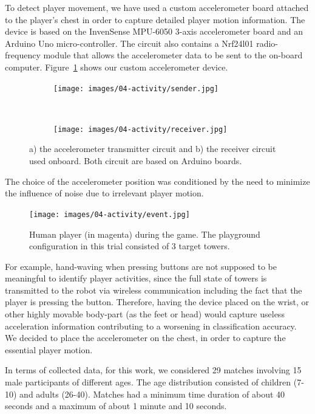 To detect player movement, we have used a custom accelerometer board attached to the player's chest in order to capture detailed player motion information. The device is based on the InvenSense MPU-6050 3-axis accelerometer board and an Arduino Uno micro-controller. The circuit also contains a Nrf24l01 radio-frequency module that allows the accelerometer data to be sent to the on-board computer. Figure~\ref{fig:the_accelerometer} shows our custom accelerometer device.

\begin{figure}[H]
      \centering
      \begin{subfigure}[t]{0.5\textwidth}
      	\centering
	    \texttt{[image: images/04-activity/sender.jpg]}
	    \caption{}
	  \end{subfigure}
	  ~
	  \begin{subfigure}[t]{0.5\textwidth}
      	\centering
	    \texttt{[image: images/04-activity/receiver.jpg]}
	    \caption{}
	  \end{subfigure}
      \caption{a) the accelerometer transmitter circuit and b) the receiver circuit used onboard. Both circuit are based on Arduino boards.}\label{fig:the_accelerometer}
\end{figure}

The choice of the accelerometer position was conditioned by the need to minimize the influence of noise due to irrelevant player motion.

\begin{figure}[thpb]
      \centering
      {\texttt{[image: images/04-activity/event.jpg]}}
      \caption{Human player (in magenta) during the game. The playground configuration in this trial consisted of 3 target towers.}
      \label{game}
\end{figure}

For example, hand-waving when pressing buttons are not supposed to be meaningful to identify player activities, since the full state of towers is transmitted to the robot via wireless communication including the fact that the player is pressing the button. Therefore, having the device placed on the wrist, or other highly movable body-part (as the feet or head) would capture useless acceleration information contributing to a worsening in classification accuracy. We decided to place the accelerometer on the chest, in order to capture the essential player motion.

In terms of collected data, for this work, we considered 29 matches involving 15 male participants of different ages. The age distribution consisted of children (7-10) and adults (26-40). Matches had a minimum time duration of about 40 seconds and a maximum of about 1 minute and 10 seconds. 

